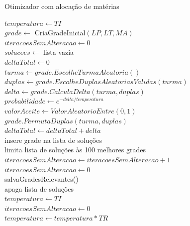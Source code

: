 \begin{algorithm}
	\caption{Otimizador com alocação de matérias}
	\label{alg:otimizadorCompleto}
	$temperatura \leftarrow TI$\\
	$grade \leftarrow$ CriaGradeInicial$(LP, LT, MA)$\\
	$iteracoesSemAlteracao \leftarrow 0$\\
	$solucoes \leftarrow$ lista vazia\\
	 {
		$deltaTotal \leftarrow 0$\\
		 {
			$turma \leftarrow grade.EscolheTurmaAleatoria()$\\
			$duplas \leftarrow grade.EscolheDuplasAleatoriasValidas(turma)$\\
			$delta \leftarrow grade.CalculaDelta(turma, duplas)$\\
			$probabilidade \leftarrow e^{-delta/temperatura}$\\
			$valorAceite \leftarrow ValorAleatorioEntre(0, 1)$\\
			 {
				$grade.PermutaDuplas(turma, duplas)$\\
				$deltaTotal \leftarrow deltaTotal + delta$\\
				 {
					insere grade na lista de soluções\\
					limita lista de soluções às 100 melhores grades\\
				}
			}
		}
		 {
			$iteracoesSemAlteracao \leftarrow iteracoesSemAlteracao + 1$\\
		}{
			$iteracoesSemAlteracao \leftarrow 0$\\
		}
		 {
			salvaGradesRelevantes()\\
			apaga lista de soluções\\
			$temperatura \leftarrow TI$\\
			$iteracoesSemAlteracao \leftarrow 0$\\
		}
		$temperatura \leftarrow temperatura * TR$
	}
\end{algorithm}
\pagebreak